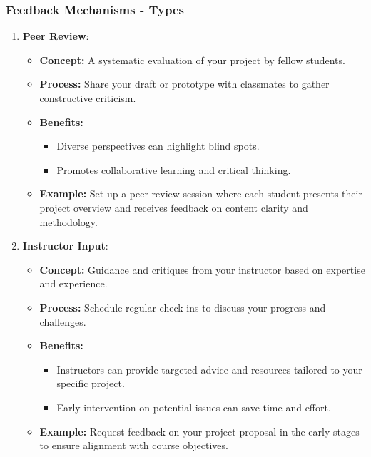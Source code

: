 \documentclass[aspectratio=169]{beamer}
\begin{document}
\begin{frame}[fragile]
    \frametitle{Feedback Mechanisms - Types}
    \begin{enumerate}
        \item \textbf{Peer Review}:
        \begin{itemize}
            \item \textbf{Concept:} A systematic evaluation of your project by fellow students.
            \item \textbf{Process:} Share your draft or prototype with classmates to gather constructive criticism.
            \item \textbf{Benefits:} 
            \begin{itemize}
                \item Diverse perspectives can highlight blind spots.
                \item Promotes collaborative learning and critical thinking.
            \end{itemize}
            \item \textbf{Example:} Set up a peer review session where each student presents their project overview and receives feedback on content clarity and methodology.
        \end{itemize}

        \item \textbf{Instructor Input}:
        \begin{itemize}
            \item \textbf{Concept:} Guidance and critiques from your instructor based on expertise and experience.
            \item \textbf{Process:} Schedule regular check-ins to discuss your progress and challenges.
            \item \textbf{Benefits:}
            \begin{itemize}
                \item Instructors can provide targeted advice and resources tailored to your specific project.
                \item Early intervention on potential issues can save time and effort.
            \end{itemize}
            \item \textbf{Example:} Request feedback on your project proposal in the early stages to ensure alignment with course objectives.
        \end{itemize}
    \end{enumerate}
\end{frame}
\end{document}
